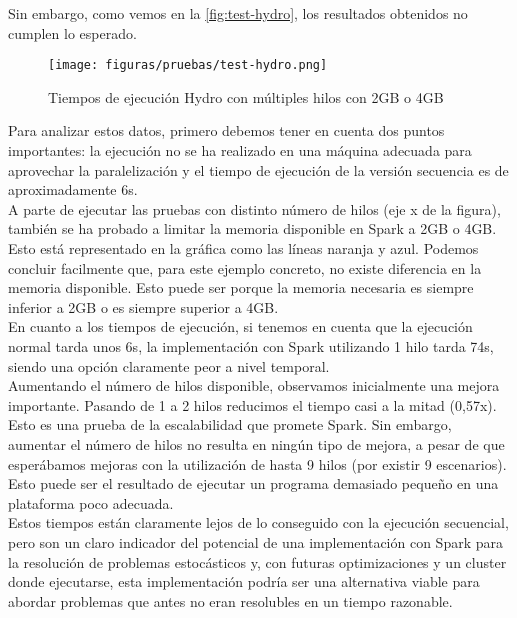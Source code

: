 Sin embargo, como vemos en la \autoref{fig:test-hydro}, los resultados obtenidos no cumplen lo esperado.\\

\begin{figure}[H]
    \centerline{\texttt{[image: figuras/pruebas/test-hydro.png]}}
    \caption{Tiempos de ejecución Hydro con múltiples hilos con 2GB o 4GB}
    \label{fig:test-hydro}
\end{figure}

Para analizar estos datos, primero debemos tener en cuenta dos puntos importantes: la ejecución no se ha realizado en una máquina adecuada para aprovechar la paralelización y el tiempo de ejecución de la versión secuencia es de aproximadamente 6s.\\

A parte de ejecutar las pruebas con distinto número de hilos (eje x de la figura), también se ha probado a limitar la memoria disponible en Spark a 2GB o 4GB. Esto está representado en la gráfica como las líneas naranja y azul. Podemos concluir facilmente que, para este ejemplo concreto, no existe diferencia en la memoria disponible. Esto puede ser porque la memoria necesaria es siempre inferior a 2GB o es siempre superior a 4GB. \\

En cuanto a los tiempos de ejecución, si tenemos en cuenta que la ejecución normal tarda unos 6s, la implementación con Spark utilizando 1 hilo tarda 74s, siendo una opción claramente peor a nivel temporal.\\

Aumentando el número de hilos disponible, observamos inicialmente una mejora importante. Pasando de 1 a 2 hilos reducimos el tiempo casi a la mitad (0,57x). Esto es una prueba de la escalabilidad que promete Spark. Sin embargo, aumentar el número de hilos no resulta en ningún tipo de mejora, a pesar de que esperábamos mejoras con la utilización de hasta 9 hilos (por existir 9 escenarios). Esto puede ser el resultado de ejecutar un programa demasiado pequeño en una plataforma poco adecuada. \\

Estos tiempos están claramente lejos de lo conseguido con la ejecución secuencial, pero son un claro indicador del potencial de una implementación con Spark para la resolución de problemas estocásticos y, con futuras optimizaciones y un cluster donde ejecutarse, esta implementación podría ser una alternativa viable para abordar problemas que antes no eran resolubles en un tiempo razonable.\\

